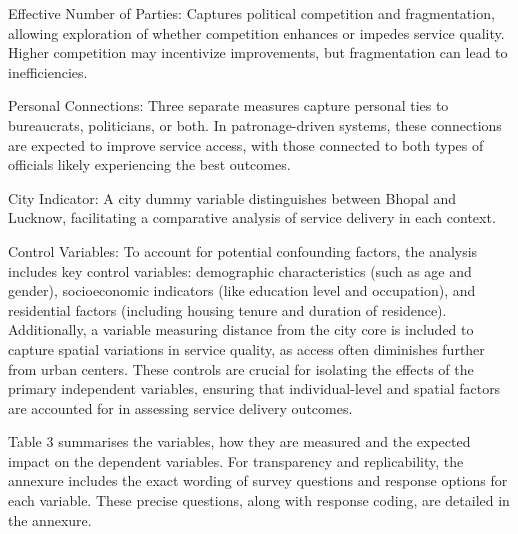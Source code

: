 Effective Number of Parties: Captures political competition and fragmentation, allowing exploration of whether competition enhances or impedes service quality. Higher competition may incentivize improvements, but fragmentation can lead to inefficiencies.

Personal Connections: Three separate measures capture personal ties to bureaucrats, politicians, or both. In patronage-driven systems, these connections are expected to improve service access, with those connected to both types of officials likely experiencing the best outcomes.

City Indicator: A city dummy variable distinguishes between Bhopal and Lucknow, facilitating a comparative analysis of service delivery in each context.


Control Variables: To account for potential confounding factors, the analysis includes key control variables: demographic characteristics (such as age and gender), socioeconomic indicators (like education level and occupation), and residential factors (including housing tenure and duration of residence). Additionally, a variable measuring distance from the city core is included to capture spatial variations in service quality, as access often diminishes further from urban centers. These controls are crucial for isolating the effects of the primary independent variables, ensuring that individual-level and spatial factors are accounted for in assessing service delivery outcomes.


Table 3 summarises the variables, how they are measured and the expected impact on the dependent variables. For transparency and replicability, the annexure includes the exact wording of survey questions and response options for each variable. These precise questions, along with response coding, are detailed in the annexure.

